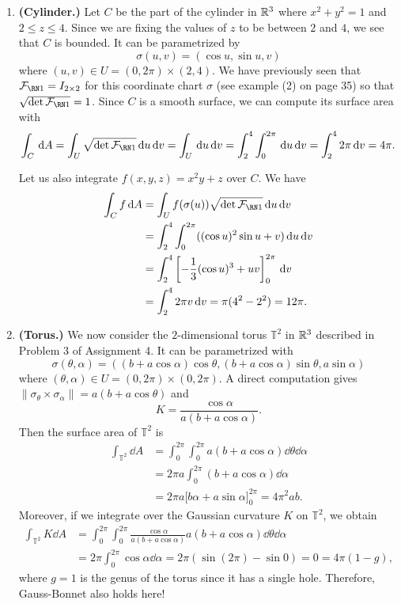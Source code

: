 \begin{enumerate}[(1)]
    \item {\bf (Cylinder.)} Let $C$ be the part of the cylinder in $\mathbb{R}^3$ where 
    $x^2 + y^2 = 1$ and $2 \leq z \leq 4$. Since we are fixing the values 
    of $z$ to be between $2$ and $4$, we see that $C$ is bounded.  
    It can be parametrized by 
    \[ \sigma(u, v) = (\cos u, \sin u, v) \] 
    where $(u, v) \in U = (0, 2\pi) \times (2, 4)$. We have previously seen that 
    $\FFF = I_{2\times 2}$ for this coordinate chart $\sigma$ 
    (see example (2) on page 35) so that $\sqrt{\det\FFF} = 1$. Since 
    $C$ is a smooth surface, we can compute its surface area with 
    \[ \int_C \dd A = \int_U \sqrt{\det\FFF} \dd u \dd v = 
    \int_U \dd u \dd v = \int_2^4 \int_0^{2\pi} \dd u \dd v = 
    \int_2^4 2\pi \dd v = 4\pi. \] 

    Let us also integrate $f(x, y, z) = x^2 y + z$ over $C$. We have 
    \begin{align*}
        \int_C f\dd A &= \int_U f(\sigma(u))\sqrt{\det \FFF}\dd u \dd v \\ 
        &= \int_2^4 \int_0^{2\pi} ((\cos u)^2 \sin u + v) \dd u \dd v \\ 
        &= \int_2^4 \left[ -\frac13(\cos u)^3 + uv \right]_0^{2\pi} \dd v \\ 
        &= \int_2^4 2\pi v\dd v = \pi(4^2 - 2^2) = 12\pi. 
    \end{align*}

    \item {\bf (Torus.)} We now consider the $2$-dimensional torus 
    $\mathbb{T}^2$ in $\mathbb{R}^3$ described in Problem 3 of Assignment 4. It can be 
    parametrized with 
    \[ \sigma(\theta, \alpha) = ((b + a\cos\alpha)\cos\theta, 
    (b + a\cos\alpha)\sin\theta, a\sin\alpha) \] 
    where $(\theta, \alpha) \in U = (0, 2\pi) \times (0, 2\pi)$. A direct 
    computation gives $\|\sigma_\theta \times \sigma_\alpha\| = a(b + a\cos\theta)$ 
    and 
    \[ K = \frac{\cos\alpha}{a(b + a\cos\alpha)}. \] 
    Then the surface area of $\mathbb T^2$ is 
    \begin{align*} 
        \int_{\mathbb T^2} \dd A 
        &= \int_0^{2\pi} \int_0^{2\pi} a(b + a\cos\alpha)\dd\theta \dd\alpha \\ 
        &= 2\pi a \int_0^{2\pi} (b + a\cos\alpha)\dd \alpha \\ 
        &= 2\pi a \Big[ b\alpha + a\sin\alpha \Big]_0^{2\pi} = 4\pi^2 ab. 
    \end{align*}
    Moreover, if we integrate over the Gaussian curvature $K$ on $\mathbb T^2$, we obtain 
    \begin{align*}
        \int_{\mathbb T^2} K\dd A 
        &= \int_0^{2\pi} \int_0^{2\pi} \frac{\cos\alpha}{a(b+a\cos\alpha)} 
        a(b+a\cos\alpha) \dd\theta \dd \alpha \\ 
        &= 2\pi \int_0^{2\pi} \cos\alpha\dd \alpha 
        = 2\pi(\sin(2\pi) - \sin 0) = 0 = 4\pi(1-g), 
    \end{align*}
    where $g = 1$ is the genus of the torus since it has a single hole. 
    Therefore, Gauss-Bonnet also holds here!

\end{enumerate}

